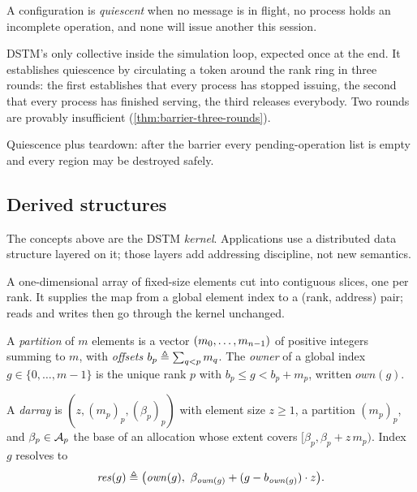 \begin{definition}[Quiescence]\label{def:quiescence}
A configuration is \emph{quiescent} when no message is in flight, no process
holds an incomplete operation, and none will issue another this
\gls{session}.
\end{definition}

DSTM's only collective inside the simulation loop, expected once at the end.
It establishes quiescence by circulating a token around the rank ring in three
rounds: the first establishes that every process has stopped issuing, the
second that every process has finished serving, the third releases everybody.
Two rounds are provably insufficient (\cref{thm:barrier-three-rounds}).

Quiescence plus teardown: after the barrier every pending-operation list is
empty and every region may be destroyed safely.

\subsection{Derived structures}
\label{sec:gloss-derived}

The concepts above are the DSTM \emph{kernel}. Applications use a distributed
data structure layered on it; those layers add addressing discipline, not new
semantics.

A one-dimensional array of fixed-size elements cut into contiguous slices, one
per rank. It supplies the map from a global element index to a
(rank, address) pair; reads and writes then go through the kernel unchanged.

\begin{definition}[Partition]\label{def:partition}
A \emph{partition} of $m$ elements is a vector
$(m_0, \dots, m_{n-1})$ of positive integers summing to $m$, with
\emph{offsets} $b_p \triangleq \sum_{q < p} m_q$. The \emph{owner} of a global
index $g \in \{0, \dots, m-1\}$ is the unique rank $p$ with
$b_p \le g < b_p + m_p$, written $\mathit{own}(g)$.
\end{definition}

\begin{definition}\label{def:darray}
A \emph{darray} is $(z, (m_p)_p, (\beta_p)_p)$ with element size $z \ge 1$, a
partition $(m_p)_p$, and $\beta_p \in \mathcal{A}_{p}$ the base of an
\gls{allocation} whose extent covers $[\beta_p, \beta_p + z\,m_p)$. Index $g$
resolves to
\[
  \mathit{res}(g) \triangleq \bigl(\mathit{own}(g),\ \beta_{\mathit{own}(g)}
    + (g - b_{\mathit{own}(g)}) \cdot z\bigr).
\]
\end{definition}

